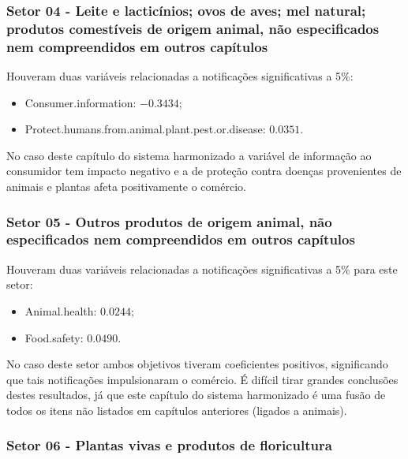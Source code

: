 \newpage

\subsubsection{Setor 04 - Leite e lacticínios; ovos de aves; mel natural; produtos comestíveis de origem animal, não especificados nem compreendidos em outros capítulos}


 

Houveram duas variáveis relacionadas a notificações significativas a 5\%:

\begin{itemize}
    \item Consumer.information: $-0.3434$;
    \item Protect.humans.from.animal.plant.pest.or.disease: $0.0351$.
\end{itemize}

No caso deste capítulo do sistema harmonizado a variável de informação ao consumidor tem impacto negativo e a de proteção contra doenças provenientes de animais e plantas afeta positivamente o comércio.

\newpage


\subsubsection{Setor 05 - Outros produtos de origem animal, não especificados nem compreendidos em outros capítulos}


 

Houveram duas variáveis relacionadas a notificações significativas a 5\% para este setor:

\begin{itemize}
    \item Animal.health: $0.0244$;
    \item Food.safety: $0.0490$.
\end{itemize}

No caso deste setor ambos objetivos tiveram coeficientes positivos, significando que tais notificações impulsionaram o comércio. É difícil tirar grandes conclusões destes resultados, já que este capítulo do sistema harmonizado é uma fusão de todos os itens não listados em capítulos anteriores (ligados a animais).

\newpage

\subsubsection{Setor 06 - Plantas vivas e produtos de floricultura}

